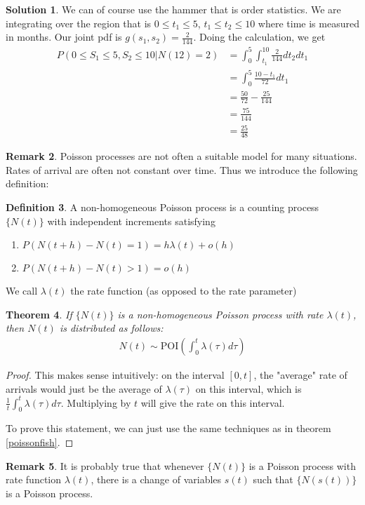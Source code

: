 \documentclass[11pt]{amsart}
\newtheorem{theorem}{Theorem}[section]
\theoremstyle{definition}
\newtheorem{definition}[theorem]{Definition}
\newtheorem{remark}[theorem]{Remark}
\newtheorem{solution}[theorem]{Solution}
\numberwithin{equation}{section}
\begin{document}
 \addtocounter{theorem}{-1}
 \begin{solution}
     We can of course use the hammer that is order statistics. We are integrating over the region that is $0\le t_1\le 5$, $t_1\le t_2\le 10$ where time is measured in months. Our joint pdf is $g(s_1,s_2)=\frac{2}{144}$. Doing the calculation, we get
     \begin{align*}
         P(0\le S_1\le 5,S_2\le 10|N(12)=2)&=\int_0^5\int_{t_1}^{10}\frac{2}{144}dt_2dt_1\\
         &=\int_0^5\frac{10-t_1}{72}dt_1\\
         &=\frac{50}{72}-\frac{25}{144}\\
         &=\frac{75}{144}\\
         &=\frac{25}{48}
     \end{align*}
 \end{solution}
 \begin{remark}
     Poisson processes are not often a suitable model for many situations. Rates of arrival are often not constant over time. Thus we introduce the following definition:
 \end{remark}
 \begin{definition}
     A non-homogeneous Poisson process is a counting process $\{N(t)\}$ with independent increments satisfying
     \begin{enumerate}
         \item $P(N(t+h)-N(t)=1)=h\lambda(t)+o(h)$
         \item $P(N(t+h)-N(t)>1)=o(h)$
     \end{enumerate}
     We call $\lambda(t)$ the rate function (as opposed to the rate parameter)
 \end{definition}
 \begin{theorem}
     If $\{N(t)\}$ is a non-homogeneous Poisson process with rate $\lambda(t)$, then $N(t)$ is distributed as follows:
     \begin{align*}
         N(t)\sim\mathrm{POI}\left(\int_0^t\lambda(\tau)d\tau\right)
     \end{align*}
 \end{theorem}
 \begin{proof}
     This makes sense intuitively: on the interval $[0,t]$, the "average" rate of arrivals would just be the average of $\lambda(\tau)$ on this interval, which is $\frac{1}{t}\int_0^t\lambda(\tau)d\tau$. Multiplying by $t$ will give the rate on this interval.

     To prove this statement, we can just use the same techniques as in theorem \ref{poissonfish}.
 \end{proof}
 \begin{remark}
     It is probably true that whenever $\{N(t)\}$ is a Poisson process with rate function $\lambda(t)$, there is a change of variables $s(t)$ such that $\{N(s(t))\}$ is a Poisson process.
 \end{remark}
\end{document}
